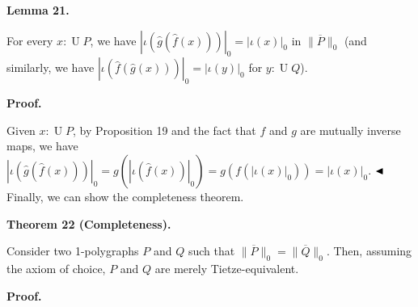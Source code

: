 \documentclass[10pt,a4paper]{amsart}
\begin{document}
 
 
\par\medskip\noindent\textbf{Lemma 21.}\par
 
 
For every $x:\operatorname{U}P$, we have $|\iota(\hat{g}(\hat{f}(x)))|_{0}=|\iota(x)|_{0}$ in $\|\overline{P}\|_{0}$ (and similarly, we have $|\iota(\hat{f}(\hat{g}(x)))|_{0}=|\iota(y)|_{0}$ for $y:\operatorname{U}Q$).\par
 
 
 
 
 
\par\medskip\noindent\textbf{Proof.}\par
 
 
Given $x:\operatorname{U}P$, by Proposition 19 and the fact that $f$ and $g$ are mutually inverse maps, we have $|\iota(\hat{g}(\hat{f}(x)))|_{0}=g(|\iota(\hat{f}(x))|_{0})=g(f(|\iota(x)|_{0}))=|\iota(x)|_{0}$. $\hfill\blacktriangleleft$ Finally, we can show the completeness theorem.\par
 

 
\par\medskip\noindent\textbf{Theorem 22 (Completeness).}\par
 
 
Consider two 1-polygraphs $P$ and $Q$ such that $\|\overline{P}\|_{0}=\|\overline{Q}\|_{0}$. Then, assuming the axiom of choice, $P$ and $Q$ are merely Tietze-equivalent.\par
 
 

 
 
\par\medskip\noindent\textbf{Proof.}\par
 
\end{document}
